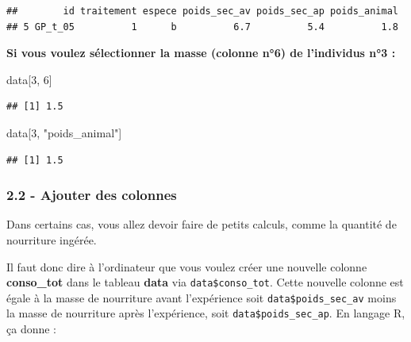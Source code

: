\documentclass[
]{article}
\newenvironment{Shaded}{\begin{snugshade}}{\end{snugshade}}
\newcommand{\DecValTok}[1]{\textcolor[rgb]{0.00,0.00,0.81}{#1}}
\newcommand{\KeywordTok}[1]{\textcolor[rgb]{0.13,0.29,0.53}{\textbf{#1}}}
\newcommand{\NormalTok}[1]{#1}
\newcommand{\OperatorTok}[1]{\textcolor[rgb]{0.81,0.36,0.00}{\textbf{#1}}}
\newcommand{\StringTok}[1]{\textcolor[rgb]{0.31,0.60,0.02}{#1}}
\begin{document}
\begin{verbatim}
##        id traitement espece poids_sec_av poids_sec_ap poids_animal
## 5 GP_t_05          1      b          6.7          5.4          1.8
\end{verbatim}

\textbf{Si vous voulez sélectionner la masse (colonne n°6) de
l'individus n°3 : }

\begin{Shaded}
\begin{Highlighting}[]
\NormalTok{data[}\DecValTok{3}\NormalTok{, }\DecValTok{6}\NormalTok{]}
\end{Highlighting}
\end{Shaded}

\begin{verbatim}
## [1] 1.5
\end{verbatim}

\begin{Shaded}
\begin{Highlighting}[]
\NormalTok{data[}\DecValTok{3}\NormalTok{, }\StringTok{"poids_animal"}\NormalTok{]}
\end{Highlighting}
\end{Shaded}

\begin{verbatim}
## [1] 1.5
\end{verbatim}

\hypertarget{ajouter-des-colonnes}{%
\subsubsection{2.2 - Ajouter des colonnes}\label{ajouter-des-colonnes}}

Dans certains cas, vous allez devoir faire de petits calculs, comme la
quantité de nourriture ingérée.

Il faut donc dire à l'ordinateur que vous voulez créer une nouvelle
colonne \textbf{conso\_tot} dans le tableau \textbf{data} via
\texttt{data\$conso\_tot}. Cette nouvelle colonne est égale à la masse
de nourriture avant l'expérience soit \texttt{data\$poids\_sec\_av}
moins la masse de nourriture après l'expérience, soit
\texttt{data\$poids\_sec\_ap}. En langage R, ça donne :

\begin{Shaded}
\end{Shaded}
\end{document}
